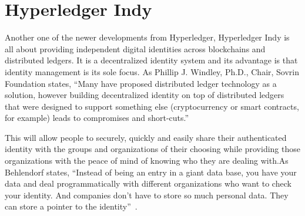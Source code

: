 \section{Hyperledger Indy}


Another one of the newer developments from Hyperledger, Hyperledger Indy 
is all about providing independent digital identities across blockchains 
and distributed ledgers. It is a decentralized identity system and its 
advantage is that identity management is its sole focus. 
As Phillip J. Windley, Ph.D., Chair, Sovrin Foundation states,  
``Many have proposed distributed ledger technology as a solution, 
however building decentralized identity on top of distributed ledgers 
that were designed to support something else (cryptocurrency or smart contracts, 
for example) leads to compromises and short-cuts.''~\cite{hid-sp18-414-Windley}

This will allow people to securely, quickly and easily share their authenticated 
identity with the groups and organizations of their choosing while providing those 
organizations with the peace of mind of knowing who they are dealing with.As Behlendorf 
states, ``Instead of being an entry in a giant data base, you have your data and deal 
programmatically with different organizations who want to check your identity. And 
companies don't have to store so much personal data. They can store a pointer to the 
identity''~\cite{hid-sp18-414-Behlendor}.
